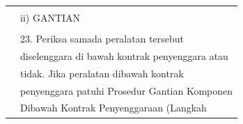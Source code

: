 \documentclass[
]{article}
\begin{document}
\begin{longtable}[]{@{}ll@{}}
\begin{minipage}[t]{0.23\columnwidth}
\strut
\end{minipage} & \begin{minipage}[t]{0.71\columnwidth}\raggedright
\strut
\end{minipage}\tabularnewline
\begin{minipage}[t]{0.23\columnwidth}\raggedright
\strut
\end{minipage} & \begin{minipage}[t]{0.71\columnwidth}\raggedright
ii) GANTIAN\strut
\end{minipage}\tabularnewline
\begin{minipage}[t]{0.23\columnwidth}\raggedright
\strut
\end{minipage} & \begin{minipage}[t]{0.71\columnwidth}\raggedright
\strut
\end{minipage}\tabularnewline
\begin{minipage}[t]{0.23\columnwidth}\raggedright
\strut
\end{minipage} & \begin{minipage}[t]{0.71\columnwidth}\raggedright
23. Periksa samada peralatan tersebut\strut
\end{minipage}\tabularnewline
\begin{minipage}[t]{0.23\columnwidth}\raggedright
\strut
\end{minipage} & \begin{minipage}[t]{0.71\columnwidth}\raggedright
diselenggara di bawah kontrak penyenggara atau\strut
\end{minipage}\tabularnewline
\begin{minipage}[t]{0.23\columnwidth}\raggedright
\strut
\end{minipage} & \begin{minipage}[t]{0.71\columnwidth}\raggedright
tidak. Jika peralatan dibawah kontrak\strut
\end{minipage}\tabularnewline
\begin{minipage}[t]{0.23\columnwidth}\raggedright
\strut
\end{minipage} & \begin{minipage}[t]{0.71\columnwidth}\raggedright
penyenggara patuhi Prosedur Gantian Komponen\strut
\end{minipage}\tabularnewline
\begin{minipage}[t]{0.23\columnwidth}\raggedright
\strut
\end{minipage} & \begin{minipage}[t]{0.71\columnwidth}\raggedright
Dibawah Kontrak Penyenggaraan (Langkah\strut

\end{minipage}
\end{longtable}
\end{document}
